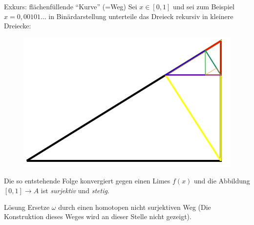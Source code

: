 \documentclass[a4paper,10pt]{scrartcl}
\begin{document}
\begin{exs*}
\begin{enumerate}[(1)]
\begin{seg}{Exkurs: flächenfüllende "`Kurve"' (=Weg)}
Sei $x\in [0,1]$ und sei zum  Beispiel $x=0,00101\dotsc  $ in Binärdarstellung unterteile das Dreieck rekursiv in kleinere Dreiecke:
\begin{figure}[ht]
\centering
\includegraphics[scale=0.3]{fig60.png}
\caption{}
\end{figure}
Die so entstehende Folge konvergiert gegen einen Limes $f(x)$ und die Abbildung $[0,1]\to A$ ist \emph{surjektiv} und \emph{stetig}.
\end{seg}
\begin{seg}{Lösung}
Ersetze $\omega$ durch einen homotopen nicht surjektiven Weg (Die Konstruktion dieses Weges wird an dieser Stelle nicht gezeigt).
\end{seg}


\end{enumerate}
\end{exs*}
\end{document}
